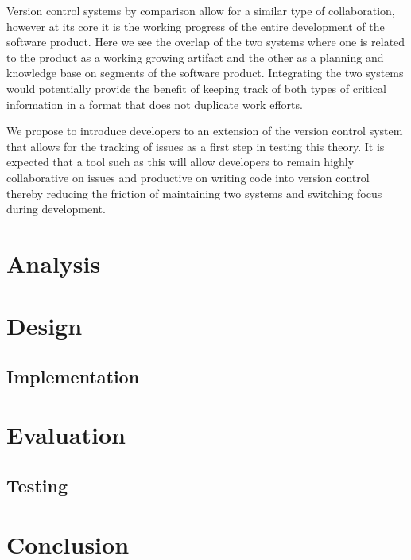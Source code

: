 \documentclass{mproj}
\begin{document}
Version control systems by comparison allow for a similar type of collaboration, however at its core it is the working progress of the entire development of the software product. Here we see the overlap of the two systems where one is related to the product as a working growing artifact and the other as a planning and knowledge base on segments of the software product. Integrating the two systems would potentially provide the benefit of keeping track of both types of critical information in a format that does not duplicate work efforts.

We propose to introduce developers to an extension of the version control system that allows for the tracking of issues as a first step in testing this theory. It is expected that a tool such as this will allow developers to remain highly collaborative on issues and productive on writing code into version control thereby reducing the friction of maintaining two systems and switching focus during development.

\chapter{Analysis}\label{analysis}

\chapter{Design}\label{design}

\section{Implementation}


\chapter{Evaluation}\label{evaluation}

\section{Testing}


\chapter{Conclusion}\label{conclusion}
\end{document}
